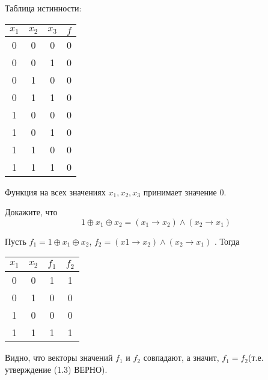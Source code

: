 \begin{solution}
	Таблица истинности:\\
\begin{center}
 \begin{tabular}{| c c c | c |}
  \hline	
 $ x_1$ & $x_2$ & $x_3$ & $f$ \\ [0,5 ex]
  \hline\hline
  0 & 0 & 0 & 0\\ [1,5 ex]
  \hline
  0 & 0 & 1 & 0 \\ [1,5 ex]
  \hline
  0 & 1 & 0 & 0 \\ [1,5 ex]
  \hline
  0 & 1 & 1 & 0 \\ [1,5 ex]
  \hline
  1 & 0 & 0 & 0\\ [1,5 ex]
  \hline
  1 & 0 & 1 & 0\\ [1,5 ex]
  \hline
  1 & 1 & 0 & 0\\ [1,5 ex]
  \hline
  1 & 1 & 1 & 0\\ [1,5 ex]
  \hline
 \end{tabular}
 \end{center}
	 Функция на всех значениях $x_1, x_2, x_3$ принимает значение $0$.
\end{solution}

\begin{exercise}
Докажите, что 
\begin{equation}
		1\oplus x_1\oplus x_2=(x_1\rightarrow x_2)\wedge(x_2\rightarrow x_1)
		\label{true_eq}
\end{equation}

\end{exercise}

\begin{solution}
 Пусть $f_1=1\oplus x_1\oplus x_2$, $f_2=(x1\rightarrow x_2)\wedge(x_2\rightarrow x_1)$ . Тогда \\
 
\begin{center}
 \begin{tabular}{| c c | c | c |}
  \hline	
 $ x_1$ & $x_2$ & $f_1$ & $f_2$ \\ [0,5 ex]
  \hline\hline
  0 & 0 & 1 & 1\\ [1,5 ex]
  \hline
  0 & 1 & 0 & 0 \\ [1,5 ex]
  \hline
  1 & 0 & 0 & 0 \\ [1,5 ex]
  \hline
  1 & 1 & 1 & 1 \\ [1,5 ex]
  \hline
 \end{tabular}
 \end{center}
Видно, что векторы значений $f_1$ и $f_2$ совпадают, а значит, $f_1=f_2$(т.е. утверждение (1.3) ВЕРНО).
\end{solution}

